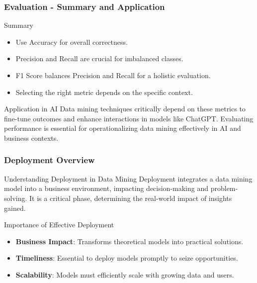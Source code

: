 \documentclass[aspectratio=169]{beamer}
\begin{document}
\begin{frame}[fragile]
    \frametitle{Evaluation - Summary and Application}
    \begin{block}{Summary}
        \begin{itemize}
            \item Use Accuracy for overall correctness.
            \item Precision and Recall are crucial for imbalanced classes.
            \item F1 Score balances Precision and Recall for a holistic evaluation.
            \item Selecting the right metric depends on the specific context.
        \end{itemize}
    \end{block}
    
    \begin{block}{Application in AI}
        Data mining techniques critically depend on these metrics to fine-tune outcomes and enhance interactions in models like ChatGPT.
        Evaluating performance is essential for operationalizing data mining effectively in AI and business contexts.
    \end{block}
    
\end{frame}

\begin{frame}[fragile]
    \frametitle{Deployment Overview}
    \begin{block}{Understanding Deployment in Data Mining}
        Deployment integrates a data mining model into a business environment, impacting decision-making and problem-solving. It is a critical phase, determining the real-world impact of insights gained.
    \end{block}
    \begin{block}{Importance of Effective Deployment}
        \begin{itemize}
            \item \textbf{Business Impact}: Transforms theoretical models into practical solutions. 
            \item \textbf{Timeliness}: Essential to deploy models promptly to seize opportunities.
            \item \textbf{Scalability}: Models must efficiently scale with growing data and users.
        \end{itemize}
    \end{block}
\end{frame}
\end{document}
